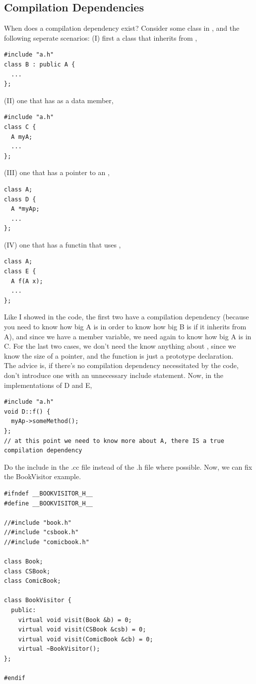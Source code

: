 \documentclass[english, 11pt]{article}
\begin{document}
\subsection{Compilation Dependencies}

When does a compilation dependency exist? Consider some class  in , and the following seperate scenarios: (I) first a class that inherits from ,
\begin{lstlisting}
#include "a.h"
class B : public A {
  ...
};
\end{lstlisting}
(II) one that has  as a data member,
\begin{lstlisting}
#include "a.h"
class C {
  A myA;
  ...
};
\end{lstlisting}
(III) one that has a pointer to an ,
\begin{lstlisting}
class A;
class D {
  A *myAp;
  ...
};
\end{lstlisting}
(IV) one that has a functin that uses ,
\begin{lstlisting}
class A;
class E {
  A f(A x);
  ...
};
\end{lstlisting}
Like I showed in the code, the first two have a compilation dependency (because you need to know how big A is in order to know how big B is if it inherits from A), and since we have a member variable, we need again to know how big A is in C. For the last two cases, we don't need the know anything about , since we know the size of a pointer, and the function is just a prototype declaration. \\

The advice is, if there's no compilation dependency necessitated by the code, don't introduce one with an unnecessary include statement. Now, in the implementations of D and E,

\begin{lstlisting}[title=d.cc]
#include "a.h"
void D::f() {
  myAp->someMethod();
};
// at this point we need to know more about A, there IS a true compilation dependency
\end{lstlisting}
Do the include in the .cc file instead of the .h file where possible. Now, we can fix the BookVisitor example.

\begin{lstlisting}
#ifndef __BOOKVISITOR_H__
#define __BOOKVISITOR_H__

//#include "book.h"
//#include "csbook.h"
//#include "comicbook.h"

class Book;
class CSBook;
class ComicBook;

class BookVisitor {
  public:
    virtual void visit(Book &b) = 0;
    virtual void visit(CSBook &csb) = 0;
    virtual void visit(ComicBook &cb) = 0;
    virtual ~BookVisitor();
};

#endif
\end{lstlisting}
\end{document}
